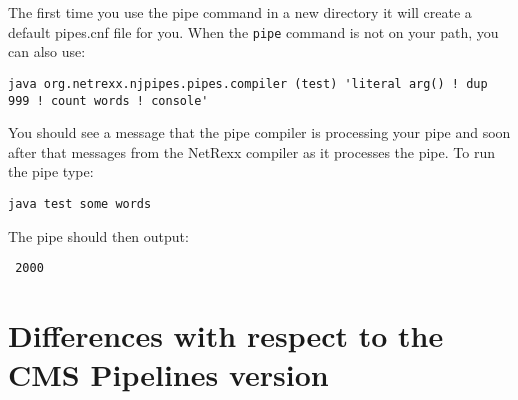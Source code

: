 The first time you use the pipe command in a new directory it will
create a default pipes.cnf file for you. When the \texttt{pipe}
command is not on your path, you can also use:

\begin{lstlisting}[label=testdup,caption=Test Dup]
java org.netrexx.njpipes.pipes.compiler (test) 'literal arg() ! dup 999 ! count words ! console'
\end{lstlisting}

You should see a message that the pipe compiler is processing your pipe and soon after that messages from the NetRexx compiler as it processes the pipe.
To run the pipe type:
\begin{verbatim}
java test some words
\end{verbatim}
The pipe should then output:
\begin{verbatim}
 2000
\end{verbatim}
\chapter{Differences with respect to the CMS Pipelines version}

